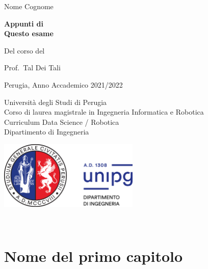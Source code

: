 \documentclass[12pt,a4paper]{report}
\begin{document}
\begin{titlepage}

{\Large \noindent Nome Cognome} \newline

\vspace{1cm}

{\begin{flushleft}
  \fontsize{21.8}{26.16} \selectfont \bfseries \noindent 
  Appunti di \\
  Questo esame \\
  \end{flushleft}}
  
  
  {\normalsize \noindent Del corso del}
  \vspace{0.2cm}
  
  {\Large \noindent Prof.~Tal Dei Tali}
  
  \vspace{8cm}


\noindent Perugia, Anno Accademico 2021/2022

\noindent Università degli Studi di Perugia \\
Corso di laurea magistrale in Ingegneria Informatica e Robotica \\
Curriculum Data Science / Robotica \\
Dipartimento di Ingegneria

\vspace{0.7cm}

\noindent \includegraphics[width=0.5\textwidth]{Figures/logounipg2021}
\restoregeometry
\end{titlepage}
\normalfont
\newpage \thispagestyle{empty} \ \newpage
\onehalfspacing
\tableofcontents



\chapter{Nome del primo capitolo}




\cleardoublepage{} %
\end{document}

